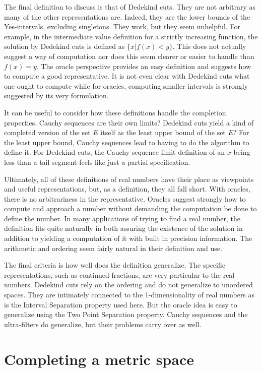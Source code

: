 \documentclass[12pt]{article}
\begin{document}
The final definition to discuss is that of Dedekind cuts. They are not arbitrary as many of the other representations are. Indeed, they are the lower bounds of the Yes-intervals, excluding singletons. They work, but they seem unhelpful. For example, in the intermediate value definition for a strictly increasing function, the solution by Dedekind cuts is defined as $\{x | f(x) < y\}$. This does not actually suggest a way of computation nor does this seem clearer or easier to handle than $f(x) = y$. The oracle perspective provides an easy definition and suggests how to compute a good representative. It is not even clear with Dedekind cuts what one ought to compute while for oracles, computing smaller intervals is strongly suggested by its very formulation. 

It can be useful to consider how these definitions handle the completion properties. Cauchy sequences are their own limits? Dedekind cuts yield a kind of completed version of the set $E$ itself as the least upper bound of the set $E$? For the least upper bound, Cauchy sequences lead to having to do the algorithm to define it. For Dedekind cuts, the Cauchy sequence limit definition of an $x$ being less than a tail segment feels like just a partial specification. 

Ultimately, all of these definitions of real numbers have their place as viewpoints and useful representations, but, as a definition, they all fall short. With oracles, there is no arbitrariness in the representative. Oracles suggest strongly how to compute and approach a number without demanding the computation be done to define the number. In many applications of trying to find a real number, the definition fits quite naturally in both assuring the existence of the solution in addition to yielding a computation of it with built in precision information. The arithmetic and ordering seem fairly natural in their definition and use. 

The final criteria is how well does the definition generalize. The specific representations, such as continued fractions, are very particular to the real numbers. Dedekind cuts rely on the ordering and do not generalize to unordered spaces. They are intimately connected to the 1-dimensionality of real numbers as is the Interval Separation property used here. But the oracle idea is easy to generalize using the Two Point Separation property. Cauchy sequences and the ultra-filters do generalize, but their problems carry over as well. 

\section{Completing a metric space}
\end{document}
